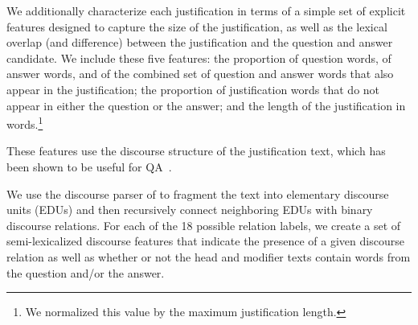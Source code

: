 {} 
We additionally characterize each justification in terms of a simple set of explicit features designed to capture the size of the justification, as well as the lexical overlap (and difference) between the justification and the question and answer candidate.  We include these five features: the proportion of question words, of answer words, and of the combined set of question and answer words that also appear in the justification; the proportion of justification words that do not appear in either the question or the answer; and the length of the justification in words.\footnote{We normalized this value by the maximum justification length.} 

{}  These features use the discourse structure of the justification text, which has been shown to be useful for QA~\cite{jansen14,sharp-EtAl:2015:NAACL-HLT, sachan2016science}. %

We use the discourse parser of \citet{Surdeanu:15} to fragment the text into elementary discourse units (EDUs) and then recursively connect neighboring EDUs with binary discourse relations.
%
For each of the 18 possible relation labels, we create 
a set of semi-lexicalized discourse features that indicate the presence of a given discourse relation as well as whether or not the head and modifier texts contain words from the question and/or the answer.  %

